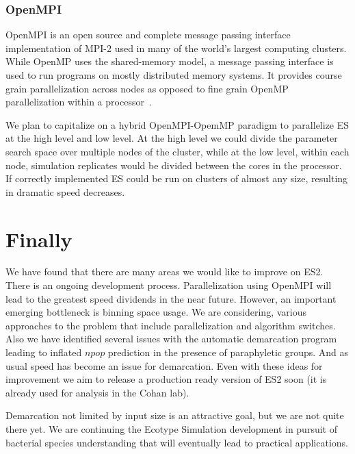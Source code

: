 \subsubsection*{OpenMPI}
OpenMPI is an open source and complete message passing interface implementation of MPI-2 used in many of the world's largest computing clusters.
While OpenMP uses the shared-memory model, a message passing interface is used to run programs on mostly distributed memory systems.
It provides course grain parallelization across nodes as opposed to fine grain OpenMP parallelization within a processor~\cite{gabriel04:_open_mpi}.

We plan to capitalize on a hybrid OpenMPI-OpemMP paradigm to parallelize ES at the high level and low level.
At the high level we could divide the parameter search space over multiple nodes of the cluster, while at the low level, within each node, simulation replicates would be divided between the cores in the processor.
If correctly implemented ES could be run on clusters of almost any size, resulting in dramatic speed decreases.



\section{Finally}
We have found that there are many areas we would like to improve on ES2.
There is an ongoing development process.
Parallelization using OpenMPI will lead to the greatest speed dividends in the near future.
However, an important emerging bottleneck is binning space usage.
We are considering, various approaches to the problem that include parallelization and algorithm switches.
Also we have identified several issues with the automatic demarcation program leading to inflated $npop$ prediction in the presence of paraphyletic groups.
And as usual speed has become an issue for demarcation.
Even with these ideas for improvement we aim to release a production ready version of ES2 soon (it is already used for analysis in the Cohan lab).

Demarcation not limited by input size is an attractive goal, but we are not quite there yet.
We are continuing the Ecotype Simulation development in pursuit of bacterial species understanding that will eventually lead to practical applications.